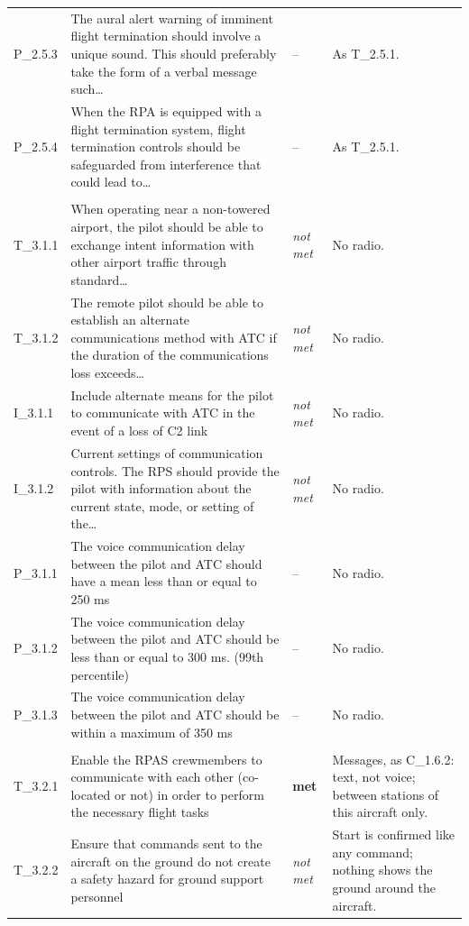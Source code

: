 \begin{longtable}{@{}>{\raggedright\arraybackslash}p{12mm}>{\raggedright\arraybackslash}p{57mm}>{\raggedright\arraybackslash}p{13mm}>{\raggedright\arraybackslash}p{70mm}@{}}
P\_2.5.3 & The aural alert warning of imminent flight termination should involve a unique sound. This should preferably take the form of a verbal message such\ldots{} & -- & As T\_2.5.1. \\
P\_2.5.4 & When the RPA is equipped with a flight termination system, flight termination controls should be safeguarded from interference that could lead to\ldots{} & -- & As T\_2.5.1. \\
\addlinespace\multicolumn{4}{@{}l}{\textbf{Air traffic control}} \\
T\_3.1.1 & When operating near a non-towered airport, the pilot should be able to exchange intent information with other airport traffic through standard\ldots{} & \emph{not met} & No radio. \\
T\_3.1.2 & The remote pilot should be able to establish an alternate communications method with ATC if the duration of the communications loss exceeds\ldots{} & \emph{not met} & No radio. \\
I\_3.1.1 & Include alternate means for the pilot to communicate with ATC in the event of a loss of C2 link & \emph{not met} & No radio. \\
I\_3.1.2 & Current settings of communication controls. The RPS should provide the pilot with information about the current state, mode, or setting of the\ldots{} & \emph{not met} & No radio. \\
P\_3.1.1 & The voice communication delay between the pilot and ATC should have a mean less than or equal to 250 ms & -- & No radio. \\
P\_3.1.2 & The voice communication delay between the pilot and ATC should be less than or equal to 300 ms. (99th percentile) & -- & No radio. \\
P\_3.1.3 & The voice communication delay between the pilot and ATC should be within a maximum of 350 ms & -- & No radio. \\
\addlinespace\multicolumn{4}{@{}l}{\textbf{Crew and ground support}} \\
T\_3.2.1 & Enable the RPAS crewmembers to communicate with each other (co- located or not) in order to perform the necessary flight tasks & \textbf{met} & Messages, as C\_1.6.2: text, not voice; between stations of this aircraft only. \\
T\_3.2.2 & Ensure that commands sent to the aircraft on the ground do not create a safety hazard for ground support personnel & \emph{not met} & Start is confirmed like any command; nothing shows the ground around the aircraft. \\

\end{longtable}
